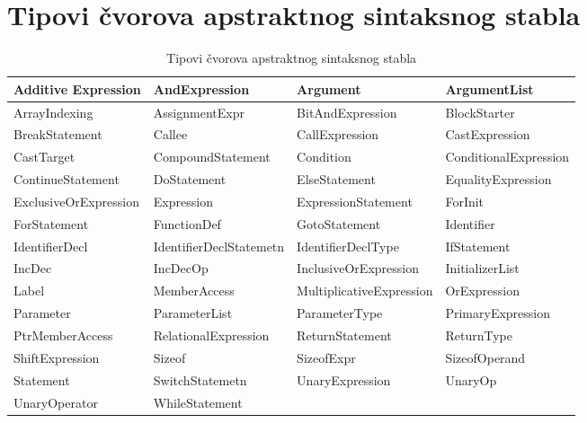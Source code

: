 \appendix
\chapter{Tipovi čvorova apstraktnog sintaksnog stabla}\label{node_types}

\begin{table}[H]
\centering
\caption{Tipovi čvorova apstraktnog sintaksnog stabla}
\label{node_types_table}
\begin{adjustbox}{width=\textwidth}
\centering
\begin{tabular}{|l|l|l|l|}
\hline

Additive Expression   & AndExpression           & Argument                 & ArgumentList          \\ \hline
ArrayIndexing         & AssignmentExpr          & BitAndExpression         & BlockStarter          \\ \hline
BreakStatement        & Callee                  & CallExpression           & CastExpression        \\ \hline
CastTarget            & CompoundStatement       & Condition                & ConditionalExpression \\ \hline
ContinueStatement     & DoStatement             & ElseStatement            & EqualityExpression    \\ \hline
ExclusiveOrExpression & Expression              & ExpressionStatement      & ForInit               \\ \hline
ForStatement          & FunctionDef             & GotoStatement            & Identifier            \\ \hline
IdentifierDecl        & IdentifierDeclStatemetn & IdentifierDeclType       & IfStatement           \\ \hline
IncDec                & IncDecOp                & InclusiveOrExpression    & InitializerList       \\ \hline
Label                 & MemberAccess            & MultiplicativeExpression & OrExpression          \\ \hline
Parameter             & ParameterList           & ParameterType            & PrimaryExpression     \\ \hline
PtrMemberAccess       & RelationalExpression    & ReturnStatement          & ReturnType            \\ \hline
ShiftExpression       & Sizeof                  & SizeofExpr               & SizeofOperand         \\ \hline
Statement             & SwitchStatemetn         & UnaryExpression          & UnaryOp               \\ \hline
UnaryOperator         & WhileStatement          & \multicolumn{2}{l|}{}                            \\ \hline

\end{tabular}
\end{adjustbox}
\end{table}